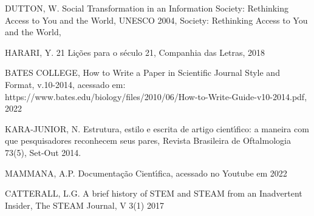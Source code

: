 \documentclass[
12pt,		%
openright,	%
twoside,  %
a4paper,			%
chapter=TITLE,		%
english,			%
french,				%
spanish,			%
brazil				%
]{USPSC-classe/USPSC}
\begin{document}
\begin{flushleft}
\begin{flushleft}
[DUTTON, 2004] DUTTON, W. Social Transformation in an Information Society: Rethinking Access to You and the World, UNESCO 2004, Society: Rethinking Access to You and the World, 
\end{flushleft}


\end{flushleft}


\begin{flushleft}
\begin{flushleft}
[HARARI, 2018]  HARARI, Y. 21 Li\c{c}\~oes para o s\'eculo 21, Companhia das Letras, 2018
\end{flushleft}


\end{flushleft}


\begin{flushleft}
\begin{flushleft}
[BATES, 2014] BATES COLLEGE, How to Write a Paper in Scientific Journal Style and Format, v.10-2014, acessado em: https://www.bates.edu/biology/files/2010/06/How-to-Write-Guide-v10-2014.pdf, 2022
\end{flushleft}


\end{flushleft}


\begin{flushleft}
\begin{flushleft}
 KARA-JUNIOR, N. Estrutura, estilo e escrita de artigo cient\'{\i}fico: a maneira com que pesquisadores reconhecem seus pares, Revista Brasileira de Oftalmologia 73(5), Set-Out 2014.
\end{flushleft}


\end{flushleft}


\begin{flushleft}
\begin{flushleft}
[MAMMANA, 2019] MAMMANA, A.P. Documenta\c{c}\~ao Cient\'{\i}fica, acessado no Youtube em 2022
\end{flushleft}


\end{flushleft}


\begin{flushleft}
\begin{flushleft}
[CATTERALL, 2017] CATTERALL, L.G. A brief history of STEM and STEAM from an Inadvertent Insider, The STEAM Journal, V 3(1) 2017
\end{flushleft}


\end{flushleft}
\end{document}
